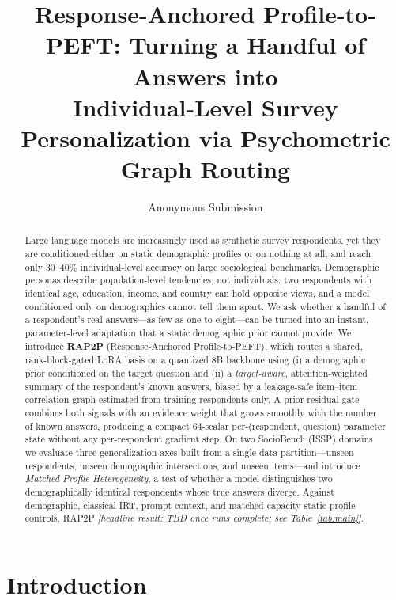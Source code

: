 \documentclass[letterpaper]{article} %
\title{Response-Anchored Profile-to-PEFT: Turning a Handful of Answers into\\ Individual-Level Survey Personalization via Psychometric Graph Routing}
\author{
    Anonymous Submission
}
\begin{document}
\maketitle

\begin{abstract}
Large language models are increasingly used as synthetic survey respondents,
yet they are conditioned either on static demographic profiles or on nothing
at all, and reach only $30$--$40\%$ individual-level accuracy on large
sociological benchmarks. Demographic personas describe population-level
tendencies, not individuals: two respondents with identical age, education,
income, and country can hold opposite views, and a model conditioned only on
demographics cannot tell them apart. We ask whether a handful of a
respondent's real answers---as few as one to eight---can be turned into an
instant, parameter-level adaptation that a static demographic prior cannot
provide. We introduce \textbf{RAP2P} (Response-Anchored Profile-to-PEFT),
which routes a shared, rank-block-gated LoRA basis on a quantized $8$B
backbone using (i) a demographic prior conditioned on the target question and
(ii) a \emph{target-aware}, attention-weighted summary of the respondent's
known answers, biased by a leakage-safe item--item correlation graph estimated
from training respondents only. A prior-residual gate combines both signals
with an evidence weight that grows smoothly with the number of known answers,
producing a compact $64$-scalar per-(respondent, question) parameter state
without any per-respondent gradient step. On two SocioBench (ISSP) domains we
evaluate three generalization axes built from a single data partition---unseen
respondents, unseen demographic intersections, and unseen items---and
introduce \emph{Matched-Profile Heterogeneity}, a test of whether a model
distinguishes two demographically identical respondents whose true answers
diverge. Against demographic, classical-IRT, prompt-context, and
matched-capacity static-profile controls, RAP2P
\emph{[headline result: TBD once runs complete; see Table~\ref{tab:main}]}.
\end{abstract}


\section{Introduction}
\end{document}
